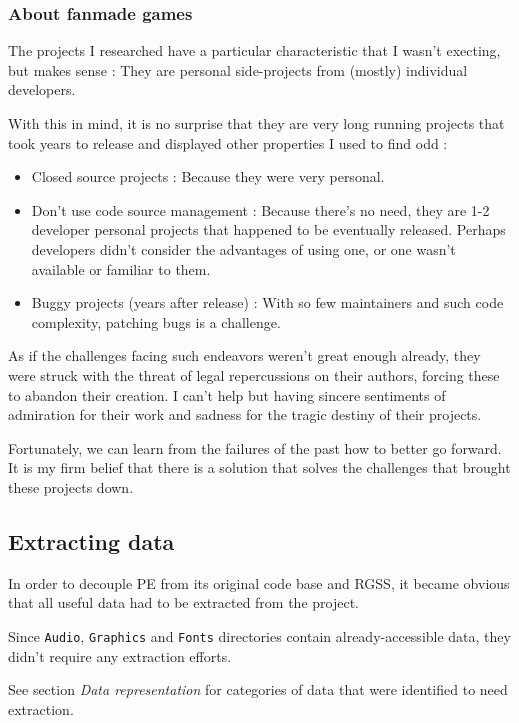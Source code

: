 \documentclass[11pt]{article}
\begin{document}
\subsubsection{About fanmade games}

The projects I researched have a particular characteristic that I wasn't execting, but makes sense : They are personal side-projects from (mostly) individual developers. 

With this in mind, it is no surprise that they are very long running projects that took years to release and displayed other properties I used to find odd :
\begin{itemize}
	\item Closed source projects : Because they were very personal.
	\item Don't use code source management : Because there's no need, they are 1-2 developer personal projects that happened to be eventually released. Perhaps developers didn't consider the advantages of using one, or one wasn't available or familiar to them.
	\item Buggy projects (years after release) : With so few maintainers and such code complexity, patching bugs is a challenge.
\end{itemize} 

As if the challenges facing such endeavors weren't great enough already, they were struck with the threat of legal repercussions on their authors, forcing these to abandon their creation. I can't help but having sincere sentiments of admiration for their work and sadness for the tragic destiny of their projects.



Fortunately, we can learn from the failures of the past how to better go forward. It is my firm belief that there is a solution that solves the challenges that brought these projects down.

\newpage
\subsection{Extracting data}

In order to decouple PE from its original code base and RGSS, it became obvious that all useful data had to be extracted from the project.

Since \verb|Audio|, \verb|Graphics| and \verb|Fonts| directories contain already-accessible data, they didn't require any extraction efforts.

See section \textit{Data representation} for categories of data that were identified to need extraction.
\end{document}
